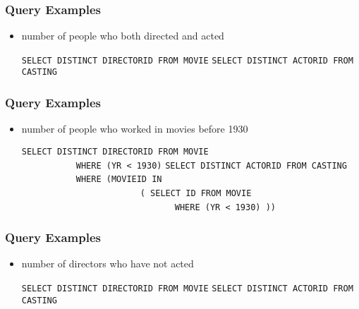 \documentclass[dvipsnames]{beamer}
\theoremstyle{plain}
\begin{document}
\begin{frame}[fragile]
  \frametitle{Query Examples}

  \begin{itemize}
  \item number of people who both directed and acted

  \medskip
{}
\lstinline!SELECT DISTINCT DIRECTORID FROM MOVIE!
\lstinline!SELECT DISTINCT ACTORID FROM CASTING!
  \end{itemize}
\end{frame}

\begin{frame}[fragile]
  \frametitle{Query Examples}

  \begin{itemize}
    \item number of people who worked in movies before 1930

    \medskip
{}
\lstinline!SELECT DISTINCT DIRECTORID FROM MOVIE!\\
~~~~~~~~~~~\lstinline!WHERE (YR < 1930)!
\lstinline!SELECT DISTINCT ACTORID FROM CASTING!\\
~~~~~~~~~~~\lstinline!WHERE (MOVIEID IN!\\
~~~~~~~~~~~~~~~~~~~~~~~~\lstinline!( SELECT ID FROM MOVIE!\\
~~~~~~~~~~~~~~~~~~~~~~~~~~~~~~~\lstinline!WHERE (YR < 1930) ))!
  \end{itemize}
\end{frame}

\begin{frame}[fragile]
  \frametitle{Query Examples}

  \begin{itemize}
    \item number of directors who have not acted

    \medskip
{}
\lstinline!SELECT DISTINCT DIRECTORID FROM MOVIE!
\lstinline!SELECT DISTINCT ACTORID FROM CASTING!
  \end{itemize}
\end{frame}
\end{document}
